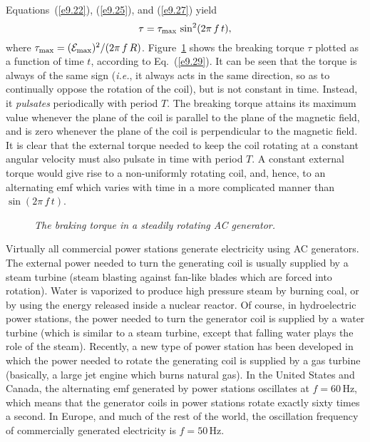 Equations~(\ref{e9.22}), (\ref{e9.25}), and (\ref{e9.27}) yield
\begin{equation}\label{e9.29}
\tau = \tau_{\rm max}\,\sin^2(2\pi \,f\,t),
\end{equation}
where $\tau_{\rm max} = ({\cal E}_{\rm max})^2/(2\pi\,f\,R)$. Figure~\ref{f9.7} shows the breaking 
torque $\tau$ plotted as a function of time $t$, according to
Eq.~(\ref{e9.29}). It can be seen that the
torque is always of the same sign ({\em i.e.}, it always acts in the same
direction, so as to continually oppose the
rotation of the coil), but  is not constant
in time. Instead, it   {\em pulsates}\/  periodically with period $T$. The breaking
torque attains its maximum value whenever the plane of the coil is parallel to the
plane of the magnetic field, and is zero whenever the plane of the coil is perpendicular
to the magnetic field. It is clear that the external torque needed
to keep the coil rotating at a constant angular velocity must also pulsate
in time with period $T$. A constant external torque would give rise to  a non-uniformly rotating
coil, and, hence, to an alternating emf which varies with  time in a more
complicated manner than $\sin(2\pi\, f\, t)$.

\begin{figure}
\epsfysize=2.5in
\centerline{}
\caption{\em The braking torque in a steadily rotating AC generator.}\label{f9.7}
\end{figure}

Virtually all commercial power stations generate electricity using AC generators. 
The external power needed to turn the generating coil is usually supplied by
a steam turbine (steam blasting against fan-like blades which are
forced into rotation). Water is vaporized to produce
high pressure 
steam  by burning coal, or by using the energy released  inside a nuclear 
reactor. 
Of course, in hydroelectric power stations, the power needed  
to turn the generator coil is supplied by a water turbine (which is similar
to a steam turbine, except that falling water plays the role of the steam). 
Recently, a new type of power station has been developed in which the
power needed to rotate the generating coil is supplied by a gas turbine
(basically, a large jet engine which burns natural gas). In the United States
and Canada, the alternating emf generated by power stations oscillates at
$f=60$\,Hz, which means that the
generator coils in power stations rotate exactly
sixty times a second. In Europe, and much of the rest of the world, the oscillation frequency
of commercially generated electricity is $f=50$\,Hz. 

